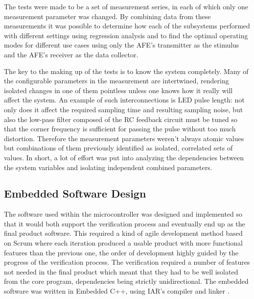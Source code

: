 The tests were made to be a set of measurement series, in each of which only one measurement parameter was changed. By combining data from these measurements it was possible to determine how each of the subsystems performed with different settings using regression analysis and to find the optimal operating modes for different use cases using only the AFE's transmitter as the stimulus and the AFE's receiver as the data collector.

The key to the making up of the tests is to know the system completely. Many of the configurable parameters in the measurement are intertwined, rendering isolated changes in one of them pointless unless one knows how it really will affect the system. An example of such interconnections is LED pulse length: not only does it affect the required sampling time and resulting sampling noise, but also the low-pass filter composed of the RC feedback circuit must be tuned so that the corner frequency is sufficient for passing the pulse without too much distortion. Therefore the measurement parameters weren't always atomic values but combinations of them previously identified as isolated, correlated sets of values. In short, a lot of effort was put into analyzing the dependencies between the system variables and isolating independent combined parameters.

\subsection{Embedded Software Design}

The software used within the microcontroller was designed and implemented so that it would both support the verification process and eventually end up as the final product software. This required a kind of agile development method based on Scrum \cite{Schwaber2009} where each iteration produced a usable product with more functional features than the previous one, the order of development highly guided by the progress of the verification process. The verification required a number of features not needed in the final product which meant that they had to be well isolated from the core program, dependencies being strictly unidirectional. The embedded software was written in Embedded C++, using IAR's compiler and linker \cite{IAR}.

